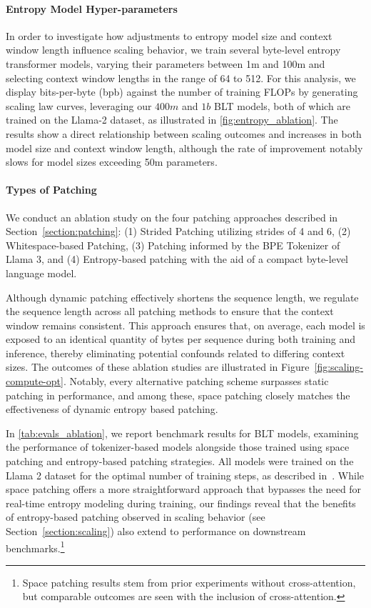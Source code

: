 \paragraph{Entropy Model Hyper-parameters} In order to investigate how adjustments to entropy model size and context window length influence scaling behavior, we train several byte-level entropy transformer models, varying their parameters between 1m and 100m and selecting context window lengths in the range of 64 to 512. For this analysis, we display bits-per-byte (bpb) against the number of training FLOPs by generating scaling law curves, leveraging our $400m$ and $1b$ {\textsc BLT} models, both of which are trained on the Llama-2 dataset, as illustrated in \autoref{fig:entropy_ablation}. The results show a direct relationship between scaling outcomes and increases in both model size and context window length, although the rate of improvement notably slows for model sizes exceeding 50m parameters.

\paragraph{Types of Patching}

We conduct an ablation study on the four patching approaches described in Section~\ref{section:patching}: (1) Strided Patching utilizing strides of 4 and 6, (2) Whitespace-based Patching, (3) Patching informed by the BPE Tokenizer of Llama 3, and (4) Entropy-based patching with the aid of a compact byte-level language model.

Although dynamic patching effectively shortens the sequence length, we regulate the sequence length across all patching methods to ensure that the context window remains consistent. This approach ensures that, on average, each model is exposed to an identical quantity of bytes per sequence during both training and inference, thereby eliminating potential confounds related to differing context sizes. The outcomes of these ablation studies are illustrated in Figure~\ref{fig:scaling-compute-opt}. Notably, every alternative patching scheme surpasses static patching in performance, and among these, space patching closely matches the effectiveness of dynamic entropy based patching.

In \autoref{tab:evals_ablation}, we report benchmark results for {\textsc BLT} models, examining the performance of tokenizer-based models alongside those trained using space patching and entropy-based patching strategies. All models were trained on the Llama 2 dataset for the optimal number of training steps, as described in~\citep{dubey2024llama}. While space patching offers a more straightforward approach that bypasses the need for real-time entropy modeling during training, our findings reveal that the benefits of entropy-based patching observed in scaling behavior (see Section~\ref{section:scaling}) also extend to performance on downstream benchmarks.\footnote{Space patching results stem from prior experiments without cross-attention, but comparable outcomes are seen with the inclusion of cross-attention.}


